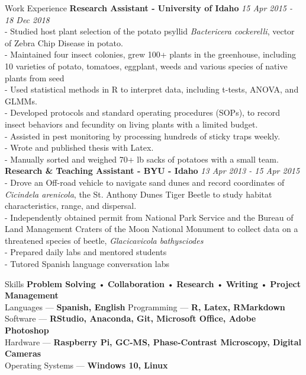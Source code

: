 \documentclass{resume} %
\begin{document}
\begin{rSection}{Work Experience}
\textbf{Research Assistant - University of Idaho} \hfill {\em \textit{15 Apr 2015 - 18 Dec 2018}}\\
- Studied host plant selection of the potato psyllid \textit{Bactericera cockerelli}, vector of Zebra Chip Disease in potato.\\
- Maintained four insect colonies, grew 100+ plants in the greenhouse, including 10 varieties of potato, tomatoes, eggplant, weeds and various species of native plants from seed\\
- Used statistical methods in R to interpret data, including t-tests, ANOVA, and GLMMs.\\
- Developed protocols and standard operating procedures (SOPs), to record insect behaviors and fecundity on living plants with a limited budget.\\
- Assisted in pest monitoring by processing hundreds of sticky traps weekly.\\
- Wrote and published thesis with Latex.\\
- Manually sorted and weighed 70+ lb sacks of potatoes with a small team.\\

\textbf{Research \& Teaching Assistant - BYU - Idaho} \hfill {\em \textit{13 Apr 2013 - 15 Apr 2015}}\\
- Drove an Off-road vehicle to navigate sand dunes and record coordinates of \textit{Cicindela arenicola}, the St. Anthony Dunes Tiger Beetle to study habitat characteristics, range, and dispersal.\\
- Independently obtained permit from National Park Service and the Bureau of Land Management Craters of the Moon National Monument to collect data on a threatened species of beetle, \textit{Glacicavicola bathysciodes}\\
- Prepared daily labs and mentored students\\
- Tutored Spanish language conversation labs\\
	\hfill
\end{rSection}


\begin{rSection}{Skills}
\textbf{Problem Solving} • \textbf{Collaboration} • \textbf{Research} • \textbf{Writing} • \textbf{Project Management}\\
Languages --- \textbf{Spanish, English} \hfill Programming --- \textbf{R, Latex, RMarkdown}\\   
Software --- \textbf{RStudio, Anaconda, Git, Microsoft Office, Adobe Photoshop}\\
Hardware --- \textbf{Raspberry Pi, GC-MS, Phase-Contrast Microscopy, Digital Cameras}\\
Operating Systems --- \textbf{Windows 10, Linux}
\end{rSection}
\end{document}
